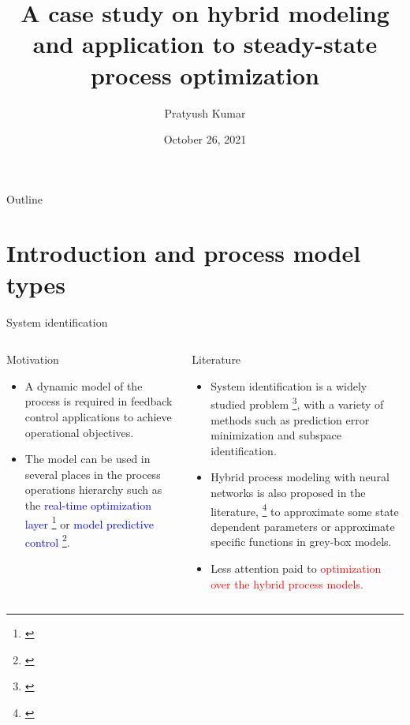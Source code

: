 \documentclass[xcolor=dvipsnames, 8pt]{beamer} %
\title{A case study on hybrid modeling and application to steady-state 
process optimization}
\date{October 26, 2021}
\author[Pratyush Kumar]{\large Pratyush Kumar}
\institute[UCSB]{
	\begin{minipage}{4in}
		\vspace{-10pt}
		\centering
		\raisebox{-0.1\height}{\texttt{[image: UCSB\_seal]}}
	\end{minipage}
	\vspace{10pt}
	\newline
	{\large Department of chemical engineering}
	\vspace{10pt}
	\newline
	{\large Group meeting presentation}}
\begin{document}
\frame{\titlepage}


\begin{frame}{Outline} 
	\tableofcontents 
\end{frame}

\section{Introduction and process model types}
\begin{frame}{System identification}

	\begin{columns}
	\column{\textwidth}

	\begin{block}{Motivation}
		\begin{itemize}
	\item A dynamic model of the process is required in feedback
		control applications to achieve operational objectives. \pause
	\medskip
	\item The model can be used in several places in the process operations 
	hierarchy such as the \textcolor{blue}{real-time optimization layer} 
		\footnote[frame]{\cite{darby:nikolaou:jones:nicholson:2011}} or 
	\textcolor{blue}{model predictive control} 
	\footnote[frame]{\cite{qin:badgwell:2003, 
	lahiri:2017}}.
	\end{itemize}
	\end{block}
	  \pause
	  \bigskip
	\begin{block}{Literature}
	  \begin{itemize}
	  \item System identification is a widely studied problem 
	  \footnote[frame]{\cite{ljung:1999, qin:2006}}, with a variety of methods 
	  such as prediction error minimization and subspace identification.
	  \medskip
	  \item Hybrid process modeling with neural networks is also proposed in 
	 the literature, \footnote[frame]{\cite{psichogios:ungar:1992, 
	 lovelett:avalos:kevrekidis:2019, chen:ierapetritou:2020, bangi:kwon:2020}} 
	 to approximate some state dependent parameters or 
	  approximate specific functions in grey-box models.	
	  \item Less attention paid to \textcolor{red}{optimization over the 
	  hybrid process models.} 
	  \end{itemize}
	\end{block}
  
\end{columns}
\end{frame}
	
\end{document}
